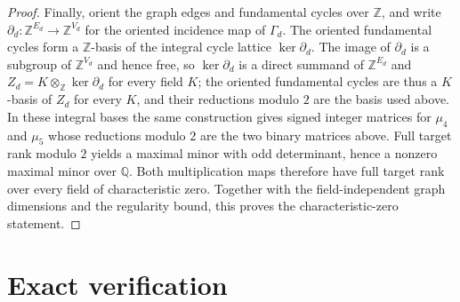 \documentclass[11pt]{amsart}
\begin{document}
\begin{proof}
Finally, orient the graph edges and fundamental cycles over
$\mathbb Z$, and write
$\partial_d:\mathbb Z^{E_d}\to\mathbb Z^{V_d}$ for the oriented
incidence map of $\Gamma_d$. The oriented fundamental cycles form a
$\mathbb Z$-basis of the integral cycle lattice $\ker\partial_d$. The
image of $\partial_d$ is a subgroup of $\mathbb Z^{V_d}$ and hence free,
so $\ker\partial_d$ is a direct summand of $\mathbb Z^{E_d}$ and
$Z_d=K\otimes_{\mathbb Z}\ker\partial_d$ for every field $K$; the
oriented fundamental cycles are thus a $K$-basis of $Z_d$ for every $K$,
and their reductions modulo $2$ are the basis used above. In these
integral bases the same construction gives signed integer matrices for
$\mu_4$ and $\mu_5$ whose reductions modulo $2$ are the two binary
matrices above. Full target
rank modulo $2$ yields a maximal minor with odd determinant, hence a
nonzero maximal minor over $\mathbb Q$. Both multiplication maps
therefore have full target rank over every field of characteristic
zero. Together with the field-independent graph dimensions and the
regularity bound, this proves the characteristic-zero statement.
\end{proof}

\section{Exact verification}
\end{document}
